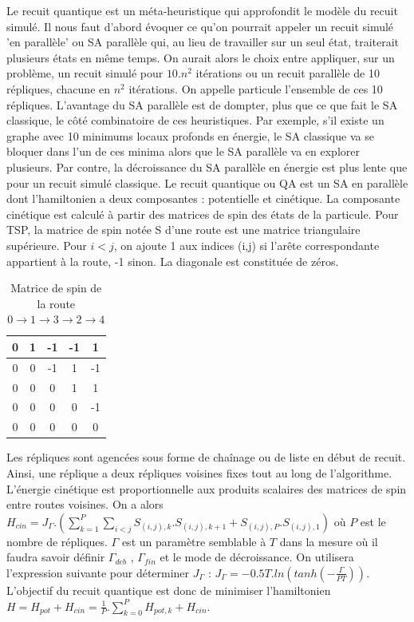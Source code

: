\documentclass{article}%
\begin{document}
	Le recuit quantique est un méta-heuristique qui approfondit le modèle du recuit simulé. Il nous faut d'abord évoquer ce qu'on pourrait appeler un recuit simulé 'en parallèle' ou SA parallèle qui, au lieu de travailler sur un seul état, traiterait plusieurs états en même temps. On aurait alors le choix entre appliquer, sur un problème, un recuit simulé pour $ 10.n^2 $ itérations ou un recuit parallèle de 10 répliques, chacune en $ n^2 $ itérations. On appelle particule l'ensemble de ces 10 répliques. L'avantage du SA parallèle est de dompter, plus que ce que fait le SA classique, le côté combinatoire de ces heuristiques. Par exemple, s'il existe un graphe avec 10 minimums locaux profonds en énergie, le SA classique va se bloquer dans l'un de ces minima alors que le SA parallèle va en explorer plusieurs. Par contre, la décroissance du SA parallèle en énergie est plus lente que pour un recuit simulé classique.
	Le recuit quantique ou QA est un SA en parallèle dont l'hamiltonien a deux composantes : potentielle et cinétique. La composante cinétique est calculé à partir des matrices de spin des états de la particule. Pour TSP, la matrice de spin notée S d'une route est une matrice triangulaire supérieure. Pour $ i < j $, on ajoute 1 aux indices (i,j) si l'arête correspondante appartient à la route, -1 sinon. La diagonale est constituée de zéros. 
	
	\begin{table}[hp]
		\centering
			\begin{tabular}{|*{5}{c|}}
					\hline
					0  & 1  & -1 & -1 & 1 \\
					\hline
					0  & 0 & -1 & 1 & -1 \\
					\hline
					0  & 0 & 0 & 1 & 1 \\
					\hline
					0  & 0 & 0 & 0 & -1 \\
					\hline
					0  & 0 & 0 & 0 & 0 \\
					\hline
			\end{tabular}
		\label{spin}
		\caption{Matrice de spin de la route $ 0 \rightarrow 1 \rightarrow 3 \rightarrow 2 \rightarrow 4 $}
	\end{table}
	
	Les répliques sont agencées sous forme de chaînage ou de liste en début de recuit. Ainsi, une réplique a deux répliques voisines fixes tout au long de l'algorithme. L'énergie cinétique est proportionnelle aux produits scalaires des matrices de spin entre routes voisines. On a alors $ H_{cin} = J_{\Gamma}.(\sum_{k=1}^P \sum_{i<j} S_{(i,j),k}.S_{(i,j),k+1} + S_{(i,j),P}.S_{(i,j),1})$ où $ P $ est le nombre de répliques. $ \Gamma $ est un paramètre semblable à $ T $ dans la mesure où il faudra savoir définir $ \Gamma_{deb} $ , $ \Gamma_{fin} $ et le mode de décroissance. On utilisera l'expression suivante pour déterminer $ J_{\Gamma} $ : $ J_{\Gamma} = -0.5T.ln(tanh(-\frac{\Gamma}{PT})) $. 
		L'objectif du recuit quantique est donc de minimiser l'hamiltonien $ H = H_{pot} + H_{cin} = \frac{1}{P}.\sum_{k=0}^P H_{pot,k} + H_{cin} $.
		
\end{document}
